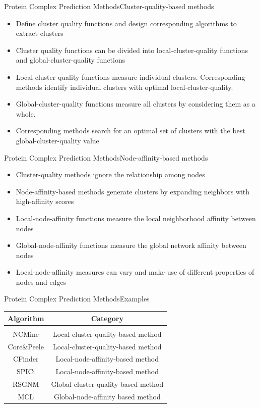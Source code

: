 \documentclass[aspectratio=169]{beamer}
\begin{document}
\begin{frame}{Protein Complex Prediction Methods}{Cluster-quality-based methods}
    \begin{itemize}
        \item Define cluster quality functions and design corresponding algorithms to extract clusters
        \item Cluster quality functions can be divided into local-cluster-quality functions and global-cluster-quality functions 
        \item Local-cluster-quality functions measure individual clusters. Corresponding methods identify individual clusters with optimal local-cluster-quality.
        \item Global-cluster-quality functions measure all clusters by considering them as a whole. 
        \item Corresponding methods search for an optimal set of clusters with the best global-cluster-quality value
    \end{itemize}
\end{frame}

\begin{frame}{Protein Complex Prediction Methods}{Node-affinity-based methods}
    \begin{itemize}
        \item Cluster-quality methods ignore the relationship among nodes 
        \item Node-affinity-based methods generate clusters by expanding neighbors with high-affinity scores
        \item Local-node-affinity functions measure the local neighborhood affinity between nodes
        \item Global-node-affinity functions measure the global network affinity between nodes
        \item Local-node-affinity measures can vary and make use of different properties of nodes and edges
    \end{itemize}
\end{frame}

\begin{frame}{Protein Complex Prediction Methods}{Examples}
\begin{center}
    \begin{tabular}{c|c}
        Algorithm & Category \\
        \hline \\
        NCMine & Local-cluster-quality-based method \\
        Core\&Peele & Local-cluster-quality-based method \\
        CFinder & Local-node-affinity-based method \\ 
        SPICi & Local-node-affinity-based method \\
        RSGNM & Global-cluster-quality based method \\
        MCL & Global-node-affinity based method
    \end{tabular}
\end{center}
\end{frame}
\end{document}
